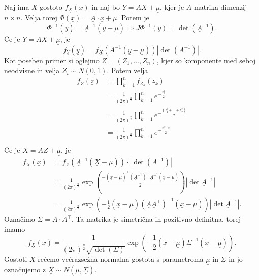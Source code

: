 \documentclass[10pt, a4paper]{article}
\begin{document}
  Naj ima $\underline{X}$ gostoto $f_{\underline{X}} (\underline{x})$ in naj bo 
  $\underline{Y} = \underline{A} \underline{X} + \underline{\mu}$, kjer je $\underline{A}$ matrika dimenzij $n \times n$.
  Velja torej $\Phi(\underline{x}) = \underline{A} \cdot \underline{x} + \underline{\mu}$.
  Potem je 
  $$\Phi^{-1} (\underline{y}) = \underline{A}^{-1} (\underline{y} - \underline{\mu}) \Rightarrow J\Phi^{-1} (y) = \det(\underline{A}^{-1}).$$
  Če je $\underline{Y} = \underline{A} \underline{X} + \underline{\mu}$, je 
  $$f_{\underline{Y}} (\underline{y}) = f_{\underline{X}} (\underline{A}^{-1}(\underline{y} - \underline{\mu})) |\det (A^{-1})|.$$
  Kot poseben primer si oglejmo $\underline{Z} = (Z_1, \dots, Z_n)$,
  kjer so komponente med seboj neodvisne in velja $Z_i \sim N(0, 1)$. Potem velja 
  \begin{align*}
    f_{\underline{Z}} (\underline{z}) &= \prod_{k = 1}^n f_{Z_k} (z_k)\\
    &= \frac{1}{(2 \pi)^{\frac{n}{2}}} \prod_{k = 1} ^n e^{-\frac{z_k^2}{2}}\\
    &= \frac{1}{(2 \pi)^{\frac{n}{2}}} \prod_{k = 1} ^n e^{-\frac{(z_1^2 + \dots + z_n^2)}{2}}\\
    &= \frac{1}{(2 \pi)^{\frac{n}{2}}} \prod_{k = 1} ^n e^{-\frac{\underline{z}^\top \cdot \underline{z}}{2}}\\
  \end{align*}
  Če je $\underline{X} = \underline{A} \underline{Z} + \underline{\mu}$, je 
  \begin{align*}
    f_{\underline{X}} (\underline{x}) &= f_{\underline{Z}} (\underline{A}^{-1} (\underline{X} - \underline{\mu})) \cdot |\det (A^{-1})|\\
    &= \frac{1}{(2 \pi)^{\frac{n}{2}}} \exp \left(\frac{- (\underline{x} - \underline{\mu})^\top (\underline{A}^{-1})^\top \underline{A}^{-1} (\underline{x} - \underline{\mu})}{2}\right) |\det \underline{A}^{-1}|\\
    &= \frac{1}{(2 \pi)^{\frac{n}{2}}} \exp \left(-\frac{1}{2} (\underline{x} - \underline{\mu}) (\underline{A}\underline{A}^\top)^{-1} (\underline{x} - \underline{\mu})\right) |\det \underline{A}^{-1}|.
  \end{align*}
  Označimo $\underline{\Sigma} = \underline{A} \cdot \underline{A}^\top$.
  Ta matrika je simetrična in pozitivno definitna, torej imamo 
  $$f_{\underline{X}} (\underline{x}) = \frac{1}{(2 \pi)^{\frac{n}{2}} \sqrt{\det(\underline{\Sigma})}} \exp\left(-\frac{1}{2} (\underline{x} - \underline{\mu}) \underline{\Sigma}^{-1} (\underline{x} - \underline{\mu})\right).$$
  Gostoti $\underline{X}$ rečemo večrazsežna normalna gostota s parametroma $\underline{\mu}$ in $\underline{\Sigma}$ in jo označujemo z $\underline{X} \sim N(\underline{\mu}, \underline{\Sigma})$.
\end{document}
